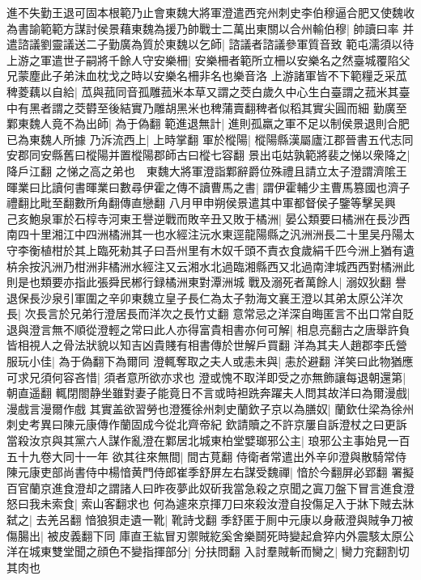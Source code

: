 進不失勤王退可固本根範乃止會東魏大將軍澄遣西兖州刺史李伯穆逼合肥又使魏收為書諭範範方謀討侯景藉東魏為援乃帥戰士二萬出東關以合州輸伯穆|{
	帥讀曰率}
并遣諮議劉靈議送二子勤廣為質於東魏以乞師|{
	諮議者諮議參軍質音致}
範屯濡須以待上游之軍遣世子嗣將千餘人守安樂柵|{
	安樂柵者範所立柵以安樂名之然臺城覆陷父兄蒙塵此子弟沬血枕戈之時以安樂名柵非名也樂音洛}
上游諸軍皆不下範糧乏采苽稗菱藕以自給|{
	苽與菰同音孤雕菰米本草又謂之茭白歲久中心生白臺謂之菰米其臺中有黑者謂之茭欎至後結實乃雕胡黑米也稗蒲賣翻稗者似稻其實尖圓而細}
勤廣至鄴東魏人竟不為出師|{
	為于偽翻}
範進退無計|{
	進則孤羸之軍不足以制侯景退則合肥已為東魏人所據}
乃泝流西上|{
	上時掌翻}
軍於樅陽|{
	樅陽縣漢屬廬江郡晉書五代志同安郡同安縣舊曰樅陽并置樅陽郡師古曰樅七容翻}
景出屯姑孰範將裴之悌以衆降之|{
	降戶江翻}
之悌之高之弟也　東魏大將軍澄詣鄴辭爵位殊禮且請立太子澄謂濟隂王暉業曰比讀何書暉業曰數尋伊霍之傳不讀曹馬之書|{
	謂伊霍輔少主曹馬篡國也濟子禮翻比毗至翻數所角翻傳直戀翻}
八月甲申朔侯景遣其中軍都督侯子鑒等擊吴興　己亥鮑泉軍於石椁寺河東王譽逆戰而敗辛丑又敗于橘洲|{
	晏公類要曰橘洲在長沙西南四十里湘江中四洲橘洲其一也水經注沅水東逕龍陽縣之汎洲洲長二十里吴丹陽太守李衡植柑於其上臨死勑其子曰吾州里有木奴千頭不責衣食歲絹千匹今洲上猶有遺枿余按汎洲乃柑洲非橘洲水經注又云湘水北過臨湘縣西又北過南津城西西對橘洲此則是也類要亦指此張舜民郴行録橘洲東對潭洲城}
戰及溺死者萬餘人|{
	溺奴狄翻}
譽退保長沙泉引軍圍之辛卯東魏立皇子長仁為太子勃海文襄王澄以其弟太原公洋次長|{
	次長言於兄弟行澄居長而洋次之長竹丈翻}
意常忌之洋深自晦匿言不出口常自貶退與澄言無不順從澄輕之常曰此人亦得富貴相書亦何可解|{
	相息亮翻古之唐舉許負皆相視人之骨法狀貌以知吉凶貴賤有相書傳於世解戶買翻}
洋為其夫人趙郡李氏營服玩小佳|{
	為于偽翻下為爾同}
澄輒奪取之夫人或恚未與|{
	恚於避翻}
洋笑曰此物猶應可求兄須何容吝惜|{
	須者意所欲亦求也}
澄或愧不取洋即受之亦無飾讓每退朝還第|{
	朝直遥翻}
輒閉閤静坐雖對妻子能竟日不言或時袒跣奔躍夫人問其故洋曰為爾漫戲|{
	漫戲言漫爾作戲}
其實盖欲習勞也澄獲徐州刺史蘭欽子京以為膳奴|{
	蘭欽仕梁為徐州刺史考異曰陳元康傳作蘭固成今從北齊帝紀}
欽請贖之不許京屢自訴澄杖之曰更訴當殺汝京與其黨六人謀作亂澄在鄴居北城東柏堂嬖瑯邪公主|{
	琅邪公主事始見一百五十九卷大同十一年}
欲其往來無間|{
	間古莧翻}
侍衛者常遣出外辛卯澄與散騎常侍陳元康吏部尚書侍中楊愔黄門侍郎崔季舒屏左右謀受魏禪|{
	愔於今翻屏必郢翻}
署擬百官蘭京進食澄却之謂諸人曰昨夜夢此奴斫我當急殺之京聞之寘刀盤下冒言進食澄怒曰我未索食|{
	索山客翻求也}
何為遽來京揮刀曰來殺汝澄自投傷足入于牀下賊去牀弑之|{
	去羌呂翻}
愔狼狽走遺一靴|{
	靴詩戈翻}
季舒匿于厠中元康以身蔽澄與賊争刀被傷腸出|{
	被皮義翻下同}
庫直王紘冒刃禦賊紇奚舍樂鬬死時變起倉猝内外震駭太原公洋在城東雙堂聞之顔色不變指揮部分|{
	分扶問翻}
入討羣賊斬而臠之|{
	臠力兖翻割切其肉也}
